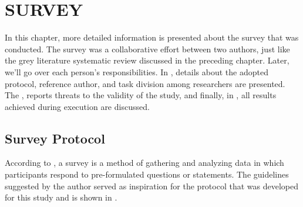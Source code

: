 \chapter{SURVEY}\label{sec:5}


In this chapter, more detailed information is presented about the survey that was conducted.
The survey was a collaborative effort between two authors, just like the grey literature systematic review discussed in the preceding chapter. Later, we'll go over each person's responsibilities.
In , details about the adopted protocol, reference author, and task division among researchers are presented.
The , reports threats to the validity of the study, and finally, in , all results achieved during execution are discussed.

\section{Survey Protocol} \label{sec:survey-protocol}


According to \textcite{kasunic2005designing}, a survey is a method of gathering and analyzing data in which participants respond to pre-formulated questions or statements. The guidelines suggested by the author served as inspiration for the protocol that was developed for this study and is shown in .

